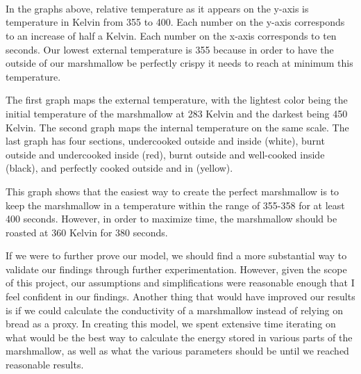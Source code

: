 \documentclass[11pt]{article}
\begin{document}
    \begin{center}
    \end{center}
    { \hspace*{\fill} \\}
    
    \begin{center}
    \end{center}
    { \hspace*{\fill} \\}
    
    \begin{center}
    \end{center}
    { \hspace*{\fill} \\}
    
    In the graphs above, relative temperature as it appears on the y-axis is
temperature in Kelvin from 355 to 400. Each number on the y-axis
corresponds to an increase of half a Kelvin. Each number on the x-axis
corresponds to ten seconds. Our lowest external temperature is 355
because in order to have the outside of our marshmallow be perfectly
crispy it needs to reach at minimum this temperature.

The first graph maps the external temperature, with the lightest color
being the initial temperature of the marshmallow at 283 Kelvin and the
darkest being 450 Kelvin. The second graph maps the internal temperature
on the same scale. The last graph has four sections, undercooked outside
and inside (white), burnt outside and undercooked inside (red), burnt
outside and well-cooked inside (black), and perfectly cooked outside and
in (yellow).

This graph shows that the easiest way to create the perfect marshmallow
is to keep the marshmallow in a temperature within the range of 355-358
for at least 400 seconds. However, in order to maximize time, the
marshmallow should be roasted at 360 Kelvin for 380 seconds.

    If we were to further prove our model, we should find a more substantial
way to validate our findings through further experimentation. However,
given the scope of this project, our assumptions and simplifications
were reasonable enough that I feel confident in our findings. Another
thing that would have improved our results is if we could calculate the
conductivity of a marshmallow instead of relying on bread as a proxy. In
creating this model, we spent extensive time iterating on what would be
the best way to calculate the energy stored in various parts of the
marshmallow, as well as what the various parameters should be until we
reached reasonable results.
\end{document}

